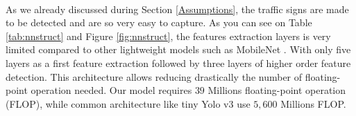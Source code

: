 \paragraph{}

As we already discussed during Section \ref{Assumptions}, the traffic signs are made to be detected and are so very easy to capture. As you can see on Table \ref{tab:nnstruct} and Figure \ref{fig:nnstruct}, the features extraction layers is very limited compared to other lightweight models such as MobileNet \cite{sandler2018mobilenetv2}. With only five layers as a first feature extraction followed by three layers of higher order feature detection. This architecture allows reducing drastically the number of floating-point operation needed. Our model requires $39$ Millions floating-point operation (FLOP), while common architecture like tiny Yolo v3 \cite{yolov3} use $5,600$ Millions FLOP.

